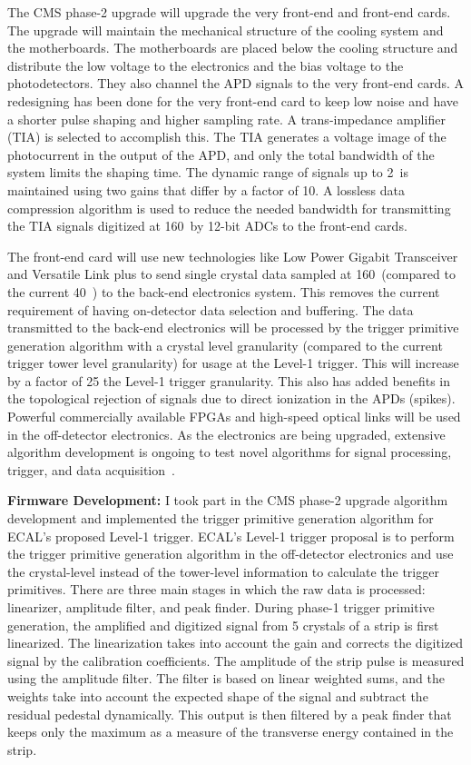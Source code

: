 The CMS phase-2 upgrade will upgrade the very front-end and front-end cards. The upgrade will maintain the mechanical structure of the cooling system and the motherboards. The motherboards are placed below the cooling structure and distribute the low voltage to the electronics and the bias voltage to the photodetectors. They also channel the APD signals to the very front-end cards. A redesigning has been done for the very front-end card to keep low noise and have a shorter pulse shaping and higher sampling rate. A trans-impedance amplifier (TIA) is selected to accomplish this. The TIA generates a voltage image of the photocurrent in the output of the APD, and only the total bandwidth of the system limits the shaping time. The dynamic range of signals up to 2~\TeV is maintained using two gains that differ by a factor of 10. A lossless data compression algorithm is used to reduce the needed bandwidth for transmitting the TIA signals digitized at 160~\mhz by 12-bit ADCs to the front-end cards.

The front-end card will use new technologies like Low Power Gigabit Transceiver and Versatile Link plus to send single crystal data sampled at 160~\mhz (compared to the current 40~\mhz) to the back-end electronics system. This removes the current requirement of having on-detector data selection and buffering. The data transmitted to the back-end electronics will be processed by the trigger primitive generation algorithm with a crystal level granularity (compared to the current trigger tower level granularity) for usage at the Level-1 trigger. This will increase by a factor of 25 the Level-1 trigger granularity. This also has added benefits in the topological rejection of signals due to direct ionization in the APDs (spikes). Powerful commercially available FPGAs and high-speed optical links will be used in the off-detector electronics. As the electronics are being upgraded, extensive algorithm development is ongoing to test novel algorithms for signal processing, trigger, and data acquisition~\cite{Ferri:2020nox}.

\textbf{Firmware Development:} I took part in the CMS phase-2 upgrade algorithm development and implemented the trigger primitive generation algorithm for ECAL's proposed Level-1 trigger. ECAL's Level-1 trigger proposal is to perform the trigger primitive generation algorithm in the off-detector electronics and use the crystal-level instead of the tower-level information to calculate the trigger primitives. There are three main stages in which the raw data is processed: linearizer, amplitude filter, and peak finder. During phase-1 trigger primitive generation, the amplified and digitized signal from 5 crystals of a strip is first linearized. The linearization takes into account the gain and corrects the digitized signal by the calibration coefficients. The amplitude of the strip pulse is measured using the amplitude filter. The filter is based on linear weighted sums, and the weights take into account the expected shape of the signal and subtract the residual pedestal dynamically. This output is then filtered by a peak finder that keeps only the maximum as a measure of the transverse energy contained in the strip.

